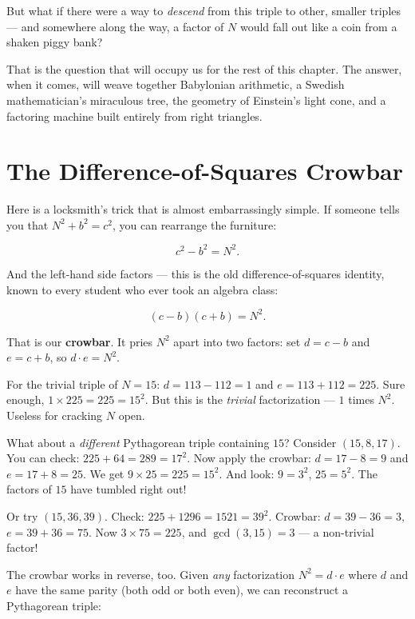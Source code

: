 \documentclass[11pt,openright,twoside]{book}
\theoremstyle{definition}
\begin{document}
But what if there were a way to \textit{descend} from this triple to other, smaller triples --- and somewhere along the way, a factor of $N$ would fall out like a coin from a shaken piggy bank?

That is the question that will occupy us for the rest of this chapter. The answer, when it comes, will weave together Babylonian arithmetic, a Swedish mathematician's miraculous tree, the geometry of Einstein's light cone, and a factoring machine built entirely from right triangles.


\bigskip


\section{The Difference-of-Squares Crowbar}

Here is a locksmith's trick that is almost embarrassingly simple. If someone tells you that $N^2 + b^2 = c^2$, you can rearrange the furniture:

\[c^2 - b^2 = N^2.\]

And the left-hand side factors --- this is the old difference-of-squares identity, known to every student who ever took an algebra class:

\[(c - b)(c + b) = N^2.\]

That is our \textbf{crowbar}. It pries $N^2$ apart into two factors: set $d = c - b$ and $e = c + b$, so $d \cdot e = N^2$.

For the trivial triple of $N = 15$: $d = 113 - 112 = 1$ and $e = 113 + 112 = 225$. Sure enough, $1 \times 225 = 225 = 15^2$. But this is the \textit{trivial} factorization --- $1$ times $N^2$. Useless for cracking $N$ open.

What about a \textit{different} Pythagorean triple containing $15$? Consider $(15, 8, 17)$. You can check: $225 + 64 = 289 = 17^2$. Now apply the crowbar: $d = 17 - 8 = 9$ and $e = 17 + 8 = 25$. We get $9 \times 25 = 225 = 15^2$. And look: $9 = 3^2$, $25 = 5^2$. The factors of $15$ have tumbled right out!

Or try $(15, 36, 39)$. Check: $225 + 1296 = 1521 = 39^2$. Crowbar: $d = 39 - 36 = 3$, $e = 39 + 36 = 75$. Now $3 \times 75 = 225$, and $\gcd(3, 15) = 3$ --- a non-trivial factor!

The crowbar works in reverse, too. Given \textit{any} factorization $N^2 = d \cdot e$ where $d$ and $e$ have the same parity (both odd or both even), we can reconstruct a Pythagorean triple:
\end{document}
